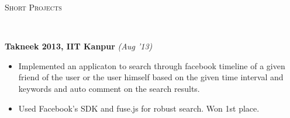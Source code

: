\documentclass[9pt]{article}
\newenvironment{changemargin}[2]{%
  \begin{list}{}{%
      \setlength{\topsep}{0pt}%
    \setlength{\leftmargin}{#1}%
    \setlength{\rightmargin}{#2}%
    \setlength{\listparindent}{\parindent}%
  \setlength{\itemindent}{\parindent}%
    \setlength{\parsep}{\parskip}%
    }%
  \item[]}{\end{list}
    }
\newcommand{\lineover}{
  \begin{changemargin}{-0.05in}{-0.10in}
    \vspace*{-9pt}
    \hrulefill \\
    \vspace*{-2pt}
  \end{changemargin}
}
\newcommand{\header}[1]{
  \begin{changemargin}{-0.5in}{-0.5in}
    \scshape{#1}\\
        \lineover
  \end{changemargin}
}
\newenvironment{body} {
  \vspace*{-16pt}
        \begin{changemargin}{-0.6in}{-0.65in}
        }	
        {\end{changemargin}
}
\begin{document}
\vspace{2mm}
  \header{Short Projects}
  \vspace{2 mm}
  \begin{body}
      \vspace{14pt}

    {\bf Takneek 2013, IIT Kanpur}	\hfill \textit{(Aug '13)} \\  
    \begin{itemize}
    \item Implemented an applicaton to search through facebook timeline of a given friend of the user or the user himself based on the given 
    time interval and keywords and auto comment on the search results.
    \item Used Facebook's SDK and fuse.js for robust search. Won 1st place.
    \end{itemize}


\end{body}
\end{document}
